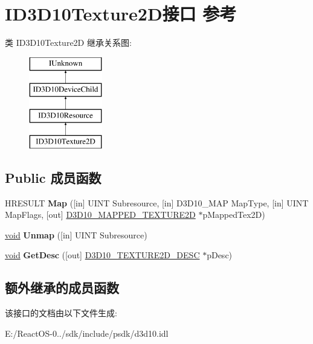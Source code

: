 \hypertarget{interface_i_d3_d10_texture2_d}{}\section{I\+D3\+D10\+Texture2\+D接口 参考}
\label{interface_i_d3_d10_texture2_d}
类 I\+D3\+D10\+Texture2D 继承关系图\+:\begin{figure}[H]
\begin{center}
\leavevmode
\includegraphics[height=4.000000cm]{interface_i_d3_d10_texture2_d}
\end{center}
\end{figure}
\subsection*{Public 成员函数}
\begin{DoxyCompactItemize}
\item 
\mbox{\label{interface_i_d3_d10_texture2_d_af59dd353d54ee36a8755b5b8ab50f1f0}} 
H\+R\+E\+S\+U\+LT {\bfseries Map} (\mbox{[}in\mbox{]} U\+I\+NT Subresource, \mbox{[}in\mbox{]} D3\+D10\+\_\+\+M\+AP Map\+Type, \mbox{[}in\mbox{]} U\+I\+NT Map\+Flags, \mbox{[}out\mbox{]} \hyperlink{struct_d3_d10___m_a_p_p_e_d___t_e_x_t_u_r_e2_d}{D3\+D10\+\_\+\+M\+A\+P\+P\+E\+D\+\_\+\+T\+E\+X\+T\+U\+R\+E2D} $\ast$p\+Mapped\+Tex2D)
\item 
\mbox{\label{interface_i_d3_d10_texture2_d_aac7366e0b505983f9ceca095cc9f29ea}} 
\hyperlink{interfacevoid}{void} {\bfseries Unmap} (\mbox{[}in\mbox{]} U\+I\+NT Subresource)
\item 
\mbox{\label{interface_i_d3_d10_texture2_d_a59b397fa9b2712bed91ac52f814e5a7d}} 
\hyperlink{interfacevoid}{void} {\bfseries Get\+Desc} (\mbox{[}out\mbox{]} \hyperlink{struct_d3_d10___t_e_x_t_u_r_e2_d___d_e_s_c}{D3\+D10\+\_\+\+T\+E\+X\+T\+U\+R\+E2\+D\+\_\+\+D\+E\+SC} $\ast$p\+Desc)
\end{DoxyCompactItemize}
\subsection*{额外继承的成员函数}


该接口的文档由以下文件生成\+:\begin{DoxyCompactItemize}
\item 
E\+:/\+React\+O\+S-\/0../sdk/include/psdk/d3d10.\+idl\end{DoxyCompactItemize}
